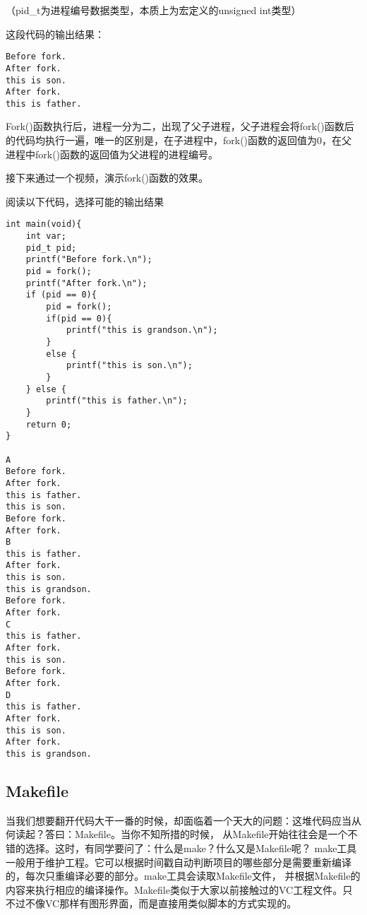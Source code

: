 （pid\_t为进程编号数据类型，本质上为宏定义的unsigned int类型）

这段代码的输出结果：
\begin{verbatim}
Before fork.
After fork.
this is son.
After fork.
this is father.
\end{verbatim}
Fork()函数执行后，进程一分为二，出现了父子进程，父子进程会将fork()函数后的代码均执行一遍，唯一的区别是，在子进程中，fork()函数的返回值为0，在父进程中fork()函数的返回值为父进程的进程编号。

接下来通过一个视频，演示fork()函数的效果。

阅读以下代码，选择可能的输出结果
\begin{verbatim}
int main(void){
	int var;
	pid_t pid;
	printf("Before fork.\n");
	pid = fork();
	printf("After fork.\n");
	if (pid == 0){
		pid = fork();
		if(pid == 0){
			printf("this is grandson.\n");
		}
		else {
			printf("this is son.\n");
		}
	} else {
		printf("this is father.\n");
	}
	return 0;
}

A
Before fork.
After fork.
this is father.
this is son.
Before fork.
After fork.
B
this is father.
After fork.
this is son.
this is grandson.
Before fork.
After fork.
C
this is father.
After fork.
this is son.
Before fork.
After fork.
D
this is father.
After fork.
this is son.
After fork.
this is grandson.
\end{verbatim}

\subsection{Makefile}
当我们想要翻开代码大干一番的时候，却面临着一个天大的问题：这堆代码应当从何读起？答曰：Makefile。当你不知所措的时候， 从Makefile开始往往会是一个不错的选择。这时，有同学要问了：什么是make？什么又是Makefile呢？ make工具一般用于维护工程。它可以根据时间戳自动判断项目的哪些部分是需要重新编译的，每次只重编译必要的部分。make工具会读取Makefile文件， 并根据Makefile的内容来执行相应的编译操作。Makefile类似于大家以前接触过的VC工程文件。只不过不像VC那样有图形界面，而是直接用类似脚本的方式实现的。

